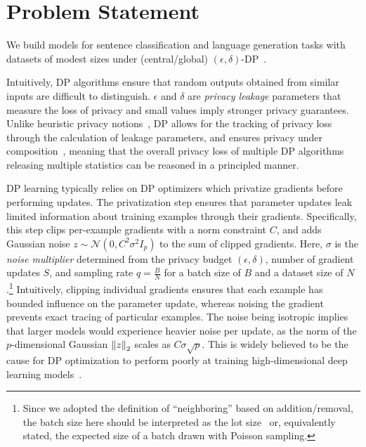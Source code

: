 \section{Problem Statement}
We build models for sentence classification and language generation tasks with datasets of modest sizes under (central/global) $(\epsilon, \delta)$-DP~\citep{dwork2014algorithmic}.

Intuitively, DP algorithms ensure that random outputs obtained from similar inputs are difficult to distinguish. 
$\epsilon$ and $\delta$ are \textit{privacy leakage} parameters that measure the loss of privacy and small values imply stronger privacy guarantees.
Unlike heuristic privacy notions~\citep{huang2020instahide}, DP allows for the tracking of privacy loss through the calculation of leakage parameters, and ensures privacy under composition~\citep{dwork2014algorithmic}, meaning that the overall privacy loss of multiple DP algorithms releasing multiple statistics can be reasoned in a principled manner.

DP learning typically relies on DP optimizers which privatize gradients before performing updates. 
The privatization step ensures that parameter updates leak limited information about training examples through their gradients.
Specifically, this step clips per-example gradients with a norm constraint $C$, and adds Gaussian noise $z\sim\mathcal{N}(0, C^2\sigma^2 I_p)$ to the sum of clipped gradients.
Here, $\sigma$ is the \textit{noise multiplier} determined from the privacy budget $(\epsilon, \delta)$, number of gradient updates $S$, and sampling rate $q=\tfrac{B}{N}$ for a batch size of $B$ and a dataset size of $N$.\footnote{Since we adopted the definition of ``neighboring'' based on addition/removal, the batch size here should be interpreted as the lot size~\citep{abadi2016deep} or, equivalently stated, the expected size of a batch drawn with Poisson sampling.}
Intuitively, clipping individual gradients ensures that each example has bounded influence on the parameter update, whereas noising the gradient prevents exact tracing of particular examples.
The noise being isotropic implies that larger models would experience heavier noise per update, as the norm of the $p$-dimensional Gaussian $\left\lVert z\right\rVert_2$ scales as $C \sigma \sqrt{p}$.
This is widely believed to be the cause for DP optimization to perform poorly at training high-dimensional deep learning models~\citep{gautum14,yu2021not}.

